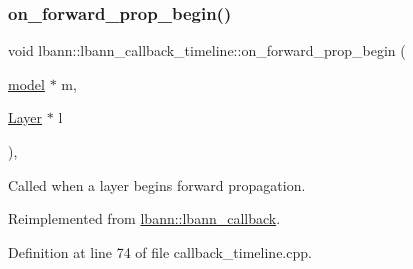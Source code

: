 \subsubsection{\texorpdfstring{on\+\_\+forward\+\_\+prop\+\_\+begin()}{on\_forward\_prop\_begin()}}
{\footnotesize\ttfamily void lbann\+::lbann\+\_\+callback\+\_\+timeline\+::on\+\_\+forward\+\_\+prop\+\_\+begin (\begin{DoxyParamCaption}\item[{\hyperlink{classlbann_1_1model}{model} $\ast$}]{m,  }\item[{\hyperlink{classlbann_1_1Layer}{Layer} $\ast$}]{l }\end{DoxyParamCaption})\hspace{0.3cm}{\ttfamily [override]}, {\ttfamily [virtual]}}

Called when a layer begins forward propagation. 

Reimplemented from \hyperlink{classlbann_1_1lbann__callback_ab96adb1d77180e00fdd668cd381323fd}{lbann\+::lbann\+\_\+callback}.



Definition at line 74 of file callback\+\_\+timeline.\+cpp.


